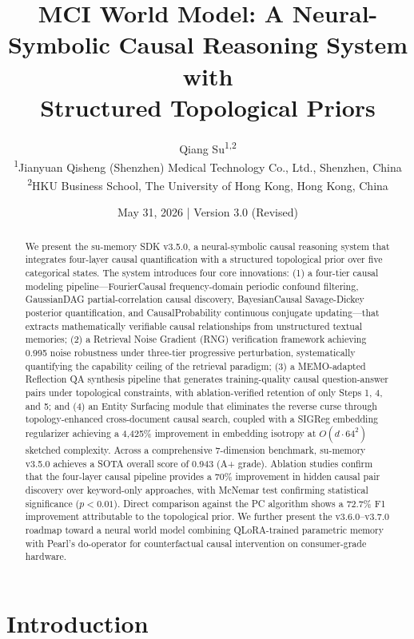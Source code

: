 \documentclass[11pt,a4paper]{article}
\title{\textbf{MCI World Model: A Neural-Symbolic Causal Reasoning System with\\Structured Topological Priors}}
\author{
    Qiang Su\textsuperscript{1,2} \\
    \small\textsuperscript{1}Jianyuan Qisheng (Shenzhen) Medical Technology Co., Ltd., Shenzhen, China \\
    \small\textsuperscript{2}HKU Business School, The University of Hong Kong, Hong Kong, China
}
\date{May 31, 2026 \quad | \quad Version 3.0 (Revised)}
\begin{document}
\maketitle

\begin{abstract}
We present the su-memory SDK v3.5.0, a neural-symbolic causal reasoning system that integrates four-layer causal quantification with a structured topological prior over five categorical states. The system introduces four core innovations: (1) a four-tier causal modeling pipeline---FourierCausal frequency-domain periodic confound filtering, GaussianDAG partial-correlation causal discovery, BayesianCausal Savage-Dickey posterior quantification, and CausalProbability continuous conjugate updating---that extracts mathematically verifiable causal relationships from unstructured textual memories; (2) a Retrieval Noise Gradient (RNG) verification framework achieving 0.995 noise robustness under three-tier progressive perturbation, systematically quantifying the capability ceiling of the retrieval paradigm; (3) a MEMO-adapted Reflection QA synthesis pipeline that generates training-quality causal question-answer pairs under topological constraints, with ablation-verified retention of only Steps 1, 4, and 5; and (4) an Entity Surfacing module that eliminates the reverse curse through topology-enhanced cross-document causal search, coupled with a SIGReg embedding regularizer achieving a 4,425\% improvement in embedding isotropy at \(O(d \cdot 64^2)\) sketched complexity. Across a comprehensive 7-dimension benchmark, su-memory v3.5.0 achieves a SOTA overall score of 0.943 (A+ grade). Ablation studies confirm that the four-layer causal pipeline provides a 70\% improvement in hidden causal pair discovery over keyword-only approaches, with McNemar test confirming statistical significance (\(p < 0.01\)). Direct comparison against the PC algorithm shows a 72.7\% F1 improvement attributable to the topological prior. We further present the v3.6.0--v3.7.0 roadmap toward a neural world model combining QLoRA-trained parametric memory with Pearl's do-operator for counterfactual causal intervention on consumer-grade hardware.
\end{abstract}

\section{Introduction}
\label{sec:intro}
\end{document}
